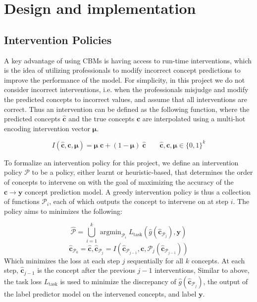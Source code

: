 \documentclass[../main.tex]{subfiles}
\begin{document}
\chapter{Design and implementation}


\section{Intervention Policies}

A key advantage of using CBMs is having access to 
run-time interventions, which is the idea of utilizing professionals
to modify incorrect concept predictions to improve the 
performance of the model.
For simplicity, in this project we do not consider incorrect interventions, 
i.e. when the professionals misjudge and modify
 the predicted concepts to incorrect values,
and assume that
all interventions are correct. Thus an intervention
can be defined as the following function, where
the predicted concepts $\hat{\mathbf{c}}$ and the true concepts $\mathbf{c}$ are interpolated
using a multi-hot encoding intervention vector $\bm{\mu}$.

\[I(\hat{\mathbf{c}}, \mathbf{c}, \bm{\mu}) = 
\bm{\mu} \; \mathbf{c} + (1 - \bm{\mu}) \; \hat{\mathbf{c}} \qquad \hat{\mathbf{c}}, \mathbf{c}, \bm{\mu} \in \{0, 1\}^k\]

To formalize an intervention policy for this
project, we define an intervention policy $\mathcal{P}$ to be a policy, either learnt
or heuristic-based, that determines the order of concepts to intervene 
on with the goal of maximizing the accuracy of the $\mathbf{c} \to \mathbf{y}$ concept prediction model.
A greedy intervention policy is thus a collection of functions $\mathcal{P}_i$, each
of which outputs the concept to intervene on at step $i$. The policy aims to minimizes 
the following:

\[\hat{\mathcal{P}} = \bigcup_{i=1}^k \mathop{\mathrm{argmin}}_{\mathcal{P}_i} L_{\text{task}}(\hat{g}(\hat{\mathbf{c}}_{\mathcal{P}_j}), \mathbf{y}) \]
\[\hat{\mathbf{c}}_{\mathcal{P}_0} = \hat{\mathbf{c}}, \hat{\mathbf{c}}_{\mathcal{P}_j} = I(\hat{\mathbf{c}}_{\mathcal{P}_{j-1}}, \mathbf{c}, \mathcal{P}_j(\hat{\mathbf{c}}_{\mathcal{P}_{j-1}}))\]
Which minimizes the loss at each step $j$ sequentially
for all $k$ concepts. At each
step, $\hat{\mathbf{c}}_{j-1}$ is 
the concept after the previous $j-1$ interventions,
Similar to above, the task loss $L_{\text{task}}$ is used to minimize
the discrepancy of $\hat{g}(\hat{\mathbf{c}}_{\mathcal{P}_j})$, 
the output of the label predictor model on the intervened concepts,
and label $\mathbf{y}$.
\end{document}
